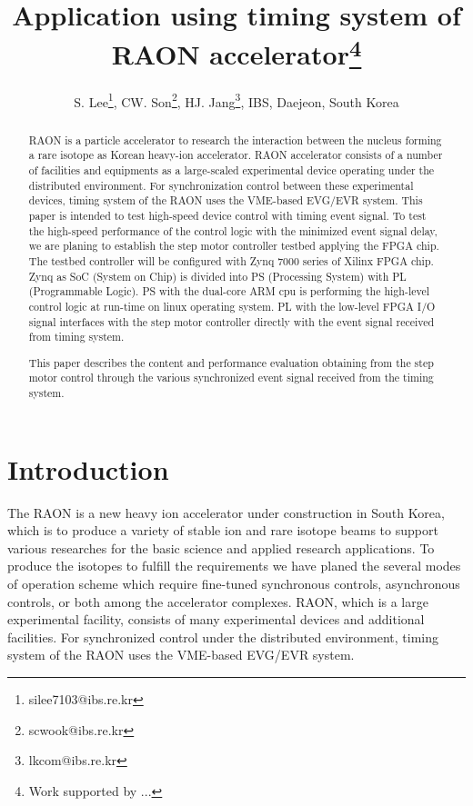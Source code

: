 \documentclass[a4paper,
              ]{jacow}
\begin{document}
\title{Application using timing system of RAON accelerator\thanks{Work supported by ...}}

\author{S. Lee\thanks{silee7103@ibs.re.kr}, CW. Son\thanks{scwook@ibs.re.kr}, HJ. Jang\thanks{lkcom@ibs.re.kr}, IBS, Daejeon, South Korea\\
       }
\maketitle

%
\begin{abstract}
   RAON is a particle accelerator to research the interaction between the nucleus forming a rare isotope as Korean heavy-ion accelerator. RAON accelerator consists of a number of facilities and equipments as a large-scaled experimental device operating under the distributed environment. For synchronization control between these experimental devices, timing system of the RAON uses the VME-based EVG/EVR system. This paper is intended to test high-speed device control with timing event signal. To test the high-speed performance of the control logic with the minimized event signal delay, we are planing to establish the step motor controller testbed applying the FPGA chip. The testbed controller will be configured with Zynq 7000 series of Xilinx FPGA chip. Zynq as SoC (System on Chip) is divided into PS (Processing System) with PL (Programmable Logic). PS with the dual-core ARM cpu is performing the high-level control logic at run-time on linux operating system. PL with the low-level FPGA I/O signal interfaces with the step motor controller directly with the event signal received from timing system.
   
   This paper describes the content and performance evaluation obtaining from the step motor control through the various synchronized event signal received from the timing system.
\end{abstract}


\section{Introduction}
The RAON is a new heavy ion accelerator under construction in South Korea, which is to produce a variety of stable ion and rare isotope beams to support various researches for the basic science and applied research applications.\cite{TSHOO:NIMB} To produce the isotopes to fulfill the requirements we have planed the several modes of operation scheme which require fine-tuned synchronous controls, asynchronous controls, or both among the accelerator complexes. RAON, which is a large experimental facility, consists of many experimental devices and additional facilities. For synchronized control under the distributed environment, timing system of the RAON uses the VME-based EVG/EVR system.
\end{document}

